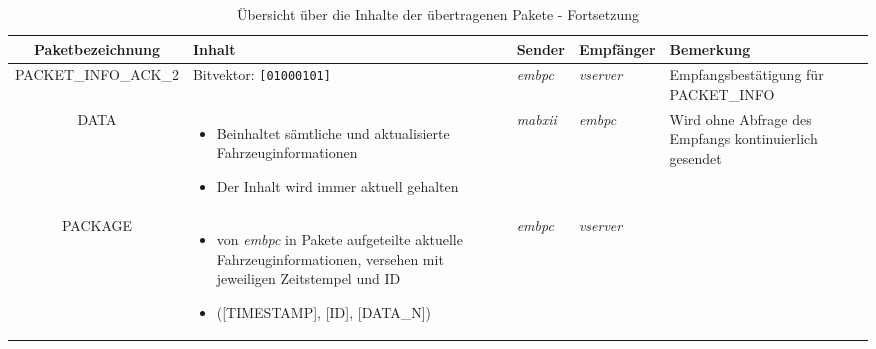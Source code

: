 \documentclass[fontsize = 12pt, paper = a4]{scrreprt}
\begin{document}
\begin{table}[H]
\centering

\caption{Übersicht über die Inhalte der übertragenen Pakete - Fortsetzung}

\begin{tabular}{c | p{4cm} | p{1.5cm} | p{2cm} | p{4cm} }
 
\toprule[1.5pt]

Paket\-bezeichnung & Inhalt & Sender & Empfänger & Bemerkung \\
 
\midrule

PACKET\_INFO\_ACK\_2 & Bitvektor: \texttt{[01000101]}

& \emph{embpc} & \emph{vserver} & Empfangsbestäti\-gung für PACKET\_INFO
 \\

\midrule

DATA & 

\vspace*{-8mm}

\begin{itemize}[leftmargin=*]

\item Beinhaltet sämtliche und aktualisierte Fahrzeuginformationen

\item Der Inhalt wird immer aktuell gehalten

\end{itemize} 

& \emph{mabxii} & \emph{embpc} & Wird ohne Abfrage des Empfangs kontinuierlich gesendet \\

\midrule

PACKAGE & 

\vspace*{-8mm}

\begin{itemize}[leftmargin=*]

\item von \emph{embpc} in Pakete aufgeteilte aktuelle Fahrzeuginformationen, versehen mit jeweiligen Zeitstempel und ID

\item ([TIMESTAMP], [ID], [DATA\_N])

\end{itemize} 

& \emph{embpc} & \emph{vserver} & 

\vspace*{-8mm}


\end{tabular}
\end{table}
\end{document}
